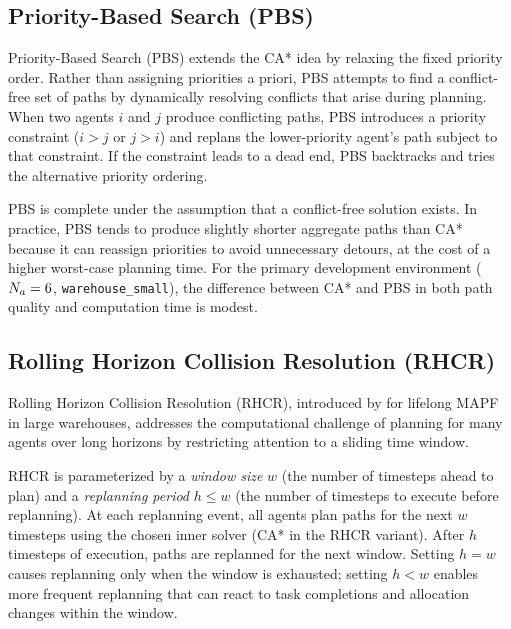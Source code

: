 \subsection{Priority-Based Search (PBS)}
\label{subsec:method_pbs}

Priority-Based Search (PBS) extends the CA* idea by relaxing the fixed
priority order.
Rather than assigning priorities a priori, PBS attempts to find a conflict-free
set of paths by dynamically resolving conflicts that arise during planning.
When two agents $i$ and $j$ produce conflicting paths, PBS introduces a
priority constraint ($i > j$ or $j > i$) and replans the lower-priority agent's
path subject to that constraint.
If the constraint leads to a dead end, PBS backtracks and tries the alternative
priority ordering.

PBS is complete under the assumption that a conflict-free solution exists.
In practice, PBS tends to produce slightly shorter aggregate paths than CA*
because it can reassign priorities to avoid unnecessary detours, at the cost of
a higher worst-case planning time.
For the primary development environment ($N_a = 6$, \texttt{warehouse\_small}),
the difference between CA* and PBS in both path quality and computation time is modest.


\subsection{Rolling Horizon Collision Resolution (RHCR)}
\label{subsec:method_rhcr}

Rolling Horizon Collision Resolution (RHCR), introduced by
\citet{li2021lifelong} for lifelong MAPF in large warehouses, addresses the
computational challenge of planning for many agents over long horizons by
restricting attention to a sliding time window.

RHCR is parameterized by a \emph{window size} $w$ (the number of timesteps
ahead to plan) and a \emph{replanning period} $h \leq w$ (the number of
timesteps to execute before replanning).
At each replanning event, all agents plan paths for the next $w$ timesteps
using the chosen inner solver (CA* in the RHCR variant).
After $h$ timesteps of execution, paths are replanned for the next window.
Setting $h = w$ causes replanning only when the window is exhausted; setting
$h < w$ enables more frequent replanning that can react to task completions
and allocation changes within the window.

